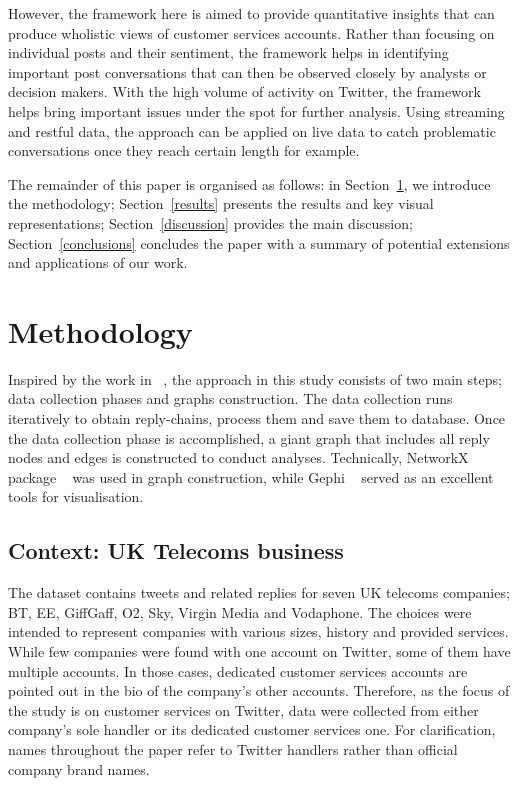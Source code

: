 \documentclass[sigconf]{acmart}
\begin{document}
However, the framework here is aimed to provide quantitative insights
that can produce wholistic views of customer services accounts. Rather
than focusing on individual posts and their sentiment, the framework
helps in identifying important post conversations that can then be
observed closely by analysts or decision makers. With the high volume
of activity on Twitter, the framework helps bring important issues
under the spot for further analysis. Using streaming and restful data,
the approach can be applied on live data to catch problematic
conversations once they reach certain length for example.

The remainder of this paper is organised as follows: in
Section~\ref{method}, we introduce the methodology;
Section~\ref{results} presents the results and key visual
representations; Section~\ref{discussion} provides the main
discussion; Section~\ref{conclusions} concludes the paper with a
summary of potential extensions and applications of our work.


\section{Methodology}\label{method}

Inspired by the work in ~\cite{Cogan2012}, the approach in this study consists of 
two main steps; data collection phases and graphs construction. The data 
collection runs iteratively to obtain reply-chains, process them and save them to
database. Once the data collection phase is accomplished, a giant
graph that includes all reply nodes and edges is constructed to conduct analyses.
Technically, NetworkX package ~\cite{Hagberg2008} was used in graph construction, 
while Gephi ~\cite{Bastian2009} served as an excellent tools for visualisation.  


\subsection{Context: UK Telecoms business}

The dataset contains tweets and related replies for seven UK telecoms 
companies; BT, EE, GiffGaff, O2, Sky, Virgin Media and Vodaphone. 
The choices were intended to represent companies with various sizes, 
history and provided services. While few companies were found with 
one account on Twitter, some of them have multiple accounts. In those 
cases, dedicated customer services accounts are pointed out in the bio 
of the company’s other accounts. Therefore, as the focus of the study 
is on customer services on Twitter, data were collected from either 
company’s sole handler or its dedicated customer services one. 
For clarification, names throughout the paper refer to Twitter handlers 
rather than official company brand names.    
\end{document}
